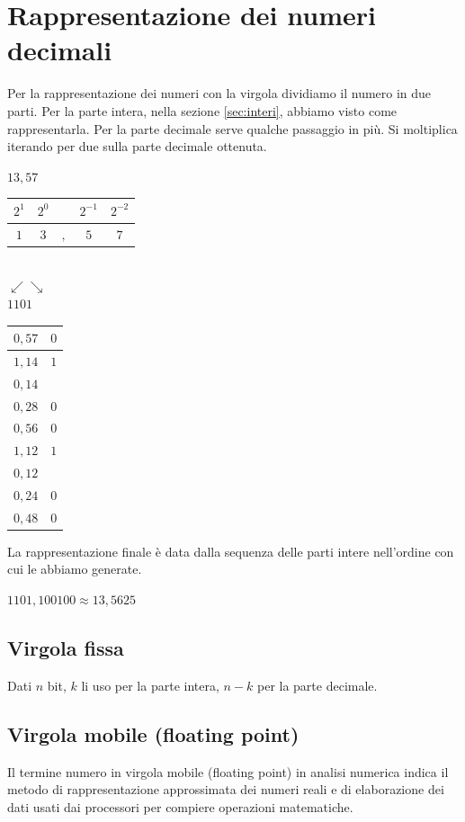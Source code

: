 \section{Rappresentazione dei numeri decimali}
Per la rappresentazione dei numeri con la virgola dividiamo il numero in due parti. Per la parte intera, nella sezione \ref{sec:interi}, abbiamo visto come rappresentarla. Per la parte decimale serve qualche passaggio in più. Si moltiplica iterando per due sulla parte decimale ottenuta.
\begin{center}
    $13,57$\\\medskip\begin{tabular}{c|c|c|c|c}
         $2^1$&$2^0$&&$2^{-1}$&$2^{-2}$\\\hline
         $1$&$3$&$,$&$5$&$7$
    \end{tabular}\\$\swarrow\searrow$\\$1101$\hspace{2cm}\begin{tabular}{c|c}
        \centering
        $0,57$&$0$\\\hline
        $1,14$&$1$\\
        $0,14$&\\\hline
        $0,28$&$0$\\\hline
        $0,56$&$0$\\\hline
        $1,12$&$1$\\
        $0,12$&\\\hline
        $0,24$&$0$\\\hline
        $0,48$&$0$
    \end{tabular}
\end{center}

La rappresentazione finale è data dalla sequenza delle parti intere nell'ordine con cui le abbiamo generate.
\begin{center}
    $1101,100100 \approx 13,5625$
\end{center}

\subsection{Virgola fissa}
Dati $n$ bit, $k$ li uso per la parte intera, $n-k$ per la parte decimale.

\subsection{Virgola mobile (floating point)}
Il termine numero in virgola mobile (floating point) in analisi numerica indica il metodo di rappresentazione approssimata dei numeri reali e di elaborazione dei dati usati dai processori per compiere operazioni matematiche.

